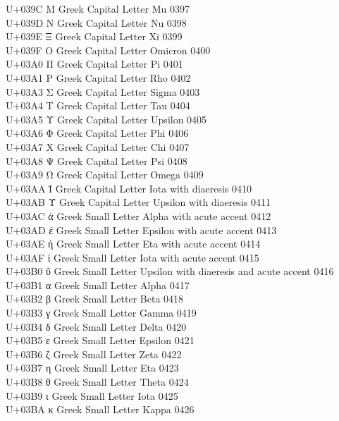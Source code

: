 \documentclass{article}
\begin{document}
U+039C  Μ Greek Capital Letter Mu 0397\\
U+039D  Ν Greek Capital Letter Nu 0398\\
U+039E  Ξ Greek Capital Letter Xi 0399\\
U+039F  Ο Greek Capital Letter Omicron  0400\\
U+03A0  Π Greek Capital Letter Pi 0401\\
U+03A1  Ρ Greek Capital Letter Rho  0402\\
U+03A3  Σ Greek Capital Letter Sigma  0403\\
U+03A4  Τ Greek Capital Letter Tau  0404\\
U+03A5  Υ Greek Capital Letter Upsilon  0405\\
U+03A6  Φ Greek Capital Letter Phi  0406\\
U+03A7  Χ Greek Capital Letter Chi  0407\\
U+03A8  Ψ Greek Capital Letter Psi  0408\\
U+03A9  Ω Greek Capital Letter Omega  0409\\
U+03AA  Ϊ Greek Capital Letter Iota with diaeresis  0410\\
U+03AB  Ϋ Greek Capital Letter Upsilon with diaeresis 0411\\
U+03AC  ά Greek Small Letter Alpha with acute accent  0412\\
U+03AD  έ Greek Small Letter Epsilon with acute accent  0413\\
U+03AE  ή Greek Small Letter Eta with acute accent  0414\\
U+03AF  ί Greek Small Letter Iota with acute accent 0415\\
U+03B0  ΰ Greek Small Letter Upsilon with diaeresis and acute accent  0416\\
U+03B1  α Greek Small Letter Alpha  0417\\
U+03B2  β Greek Small Letter Beta 0418\\
U+03B3  γ Greek Small Letter Gamma  0419\\
U+03B4  δ Greek Small Letter Delta  0420\\
U+03B5  ε Greek Small Letter Epsilon  0421\\
U+03B6  ζ Greek Small Letter Zeta 0422\\
U+03B7  η Greek Small Letter Eta  0423\\
U+03B8  θ Greek Small Letter Theta  0424\\
U+03B9  ι Greek Small Letter Iota 0425\\
U+03BA  κ Greek Small Letter Kappa  0426\\
\end{document}
